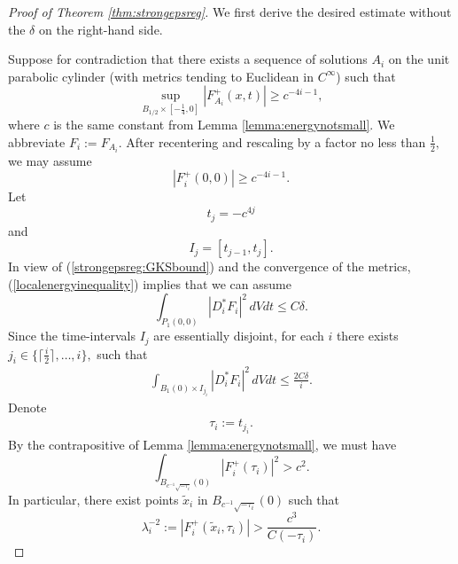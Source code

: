 \documentclass[12pt]{amsart}
\newcommand{\LB}{\left[}
\newcommand{\RB}{\right]}
\renewcommand{\1}{{\mathbf 1}}
\theoremstyle{others}
\numberwithin{equation}{section}
\begin{document}
\begin{proof}[Proof of Theorem \ref{thm:strongepsreg}]
We first derive the desired estimate without the $\delta$ on the right-hand side.

Suppose for contradiction that there exists a sequence of solutions $A_i$ on the unit parabolic cylinder (with metrics tending to Euclidean in $C^\infty$) such that
$$\sup_{B_{1/2} \times \LB -\frac14, 0 \RB} |F^+_{A_i}(x,t) | \geq c^{-4i-1},$$%
where $c$ is the same constant from Lemma \ref{lemma:energynotsmall}. We abbreviate $F_i := F_{A_i}.$ After recentering and rescaling by a factor no less than $\frac12,$ we may assume
$$|F^+_i(0,0)| \geq c^{-4i-1}.$$
Let
$$t_j = -c^{4j}$$
and
$$I_j = \LB t_{j-1}, t_{j} \RB.$$
In view of (\ref{strongepsreg:GKSbound}) and the convergence of the metrics, (\ref{localenergyinequality}) implies that we can assume
$$\int_{P_1(0, 0)} |D_i^*F_i|^2 \, dV dt \leq C \delta.$$
Since the time-intervals $I_j$ are essentially disjoint, for each $i$ there exists $j_i \in \{\lceil \frac{i}{2} \rceil, \ldots, i\},$ such that
\begin{align}\label{tensiongoingtozero}
    \int_{B_1(0) \times I_{j_i}} |D_i^*F_{i}|^2 \, dV dt \leq \frac{2C \delta}{i}.
\end{align} Denote
\begin{align*}
    \tau_i := t_{j_i}.
\end{align*} By the contrapositive of Lemma \ref{lemma:energynotsmall}, we must %
have $$\int_{B_{c^{-1}\sqrt{-\tau_i}}(0)} |F^+_i(\tau_i)|^2 > c^2.$$
In particular, there exist %
points \(\tilde{x}_{i}\) in \(B_{c^{-1}\sqrt{-\tau_i}}(0)\) such that
\begin{equation}
\lambda_i^{-2} := |F^+_i(\tilde{x}_{i}, \tau_i)| > \frac{c^{3}}{C(-\tau_i)}.
\end{equation}

\end{proof}
\end{document}
